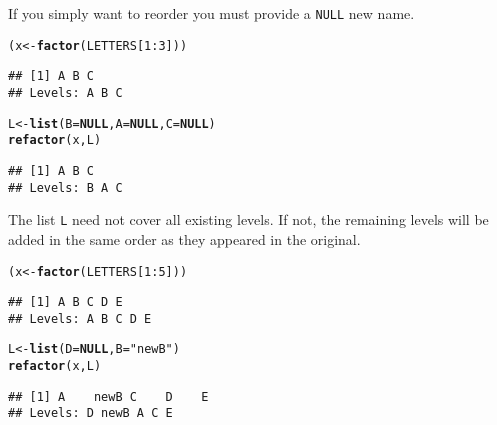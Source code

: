 \documentclass{article}\usepackage[]{graphicx}\usepackage[]{color}
\makeatletter
\newcommand{\hlnum}[1]{\textcolor[rgb]{0.686,0.059,0.569}{#1}}%
\newcommand{\hlstr}[1]{\textcolor[rgb]{0.192,0.494,0.8}{#1}}%
\newcommand{\hlopt}[1]{\textcolor[rgb]{0,0,0}{#1}}%
\newcommand{\hlstd}[1]{\textcolor[rgb]{0.345,0.345,0.345}{#1}}%
\newcommand{\hlkwa}[1]{\textcolor[rgb]{0.161,0.373,0.58}{\textbf{#1}}}%
\newcommand{\hlkwb}[1]{\textcolor[rgb]{0.69,0.353,0.396}{#1}}%
\newcommand{\hlkwc}[1]{\textcolor[rgb]{0.333,0.667,0.333}{#1}}%
\newcommand{\hlkwd}[1]{\textcolor[rgb]{0.737,0.353,0.396}{\textbf{#1}}}%
\newenvironment{kframe}{%
 \def\at@end@of@kframe{}%
 \ifinner\ifhmode%
  \def\at@end@of@kframe{\end{minipage}}%
  \begin{minipage}{\columnwidth}%
 \fi\fi%
 \def\FrameCommand##1{\hskip\@totalleftmargin \hskip-\fboxsep
 \colorbox{shadecolor}{##1}\hskip-\fboxsep
     \hskip-\linewidth \hskip-\@totalleftmargin \hskip\columnwidth}%
 \MakeFramed {\advance\hsize-\width
   \@totalleftmargin\z@ \linewidth\hsize
   \@setminipage}}%
 {\par\unskip\endMakeFramed%
 \at@end@of@kframe}
\newenvironment{knitrout}{}{} %
\newcommand{\code}{\texttt}
\makeatother
\begin{document}
If you simply want to reorder you must provide a \code{NULL} new name.
\begin{knitrout}
\color{fgcolor}\begin{kframe}
\begin{alltt}
\hlstd{(x} \hlkwb{<-} \hlkwd{factor}\hlstd{(LETTERS[}\hlnum{1}\hlopt{:}\hlnum{3}\hlstd{]))}
\end{alltt}
\begin{verbatim}
## [1] A B C
## Levels: A B C
\end{verbatim}
\begin{alltt}
\hlstd{L} \hlkwb{<-} \hlkwd{list}\hlstd{(}\hlkwc{B}\hlstd{=}\hlkwa{NULL}\hlstd{,} \hlkwc{A}\hlstd{=}\hlkwa{NULL}\hlstd{,} \hlkwc{C}\hlstd{=}\hlkwa{NULL}\hlstd{)}
\hlkwd{refactor}\hlstd{(x,L)}
\end{alltt}
\begin{verbatim}
## [1] A B C
## Levels: B A C
\end{verbatim}
\end{kframe}
\end{knitrout}
The list \code{L} need not cover all existing levels. If not, the remaining levels will be added in the same order as they appeared in the original.
\begin{knitrout}
\color{fgcolor}\begin{kframe}
\begin{alltt}
\hlstd{(x} \hlkwb{<-} \hlkwd{factor}\hlstd{(LETTERS[}\hlnum{1}\hlopt{:}\hlnum{5}\hlstd{]))}
\end{alltt}
\begin{verbatim}
## [1] A B C D E
## Levels: A B C D E
\end{verbatim}
\begin{alltt}
\hlstd{L} \hlkwb{<-} \hlkwd{list}\hlstd{(}\hlkwc{D}\hlstd{=}\hlkwa{NULL}\hlstd{,} \hlkwc{B}\hlstd{=}\hlstr{"newB"}\hlstd{)}
\hlkwd{refactor}\hlstd{(x,L)}
\end{alltt}
\begin{verbatim}
## [1] A    newB C    D    E   
## Levels: D newB A C E
\end{verbatim}
\end{kframe}
\end{knitrout}
\end{document}
